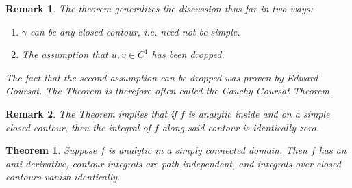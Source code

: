 \documentclass[12pt, a4paper]{article}
\theoremstyle{plain}
\newtheorem{thm}{Theorem} %
\newtheorem{rem}{Remark}
\theoremstyle{definition}
\begin{document}
			\begin{rem}
				The theorem generalizes the discussion thus far in two ways:
				\begin{enumerate}[label=(\roman*)]
					\item $\gamma$ can be any closed contour, i.e. need not be simple.
					\item The assumption that $u,v\in C^1$ has been dropped.
				\end{enumerate}

				The fact that the second assumption can be dropped was proven by Edward Goursat. The Theorem is therefore often called the Cauchy-Goursat Theorem.\\
			\end{rem}

			\begin{rem}
				The Theorem implies that if $f$ is analytic inside and on a simple closed contour, then the integral of $f$ along said contour is identically zero.\\
			\end{rem}

			\begin{thm}
				Suppose $f$ is analytic in a simply connected domain. Then $f$ has an anti-derivative, contour integrals are path-independent, and integrals over closed contours vanish identically.\\
			\end{thm}
\end{document}
